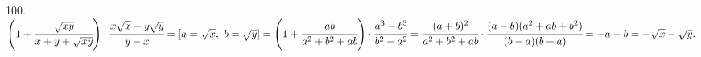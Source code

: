 100. $\left(1+\cfrac{\sqrt{xy}}{x+y+\sqrt{xy}}\right)\cdot\cfrac{x\sqrt{x}-y\sqrt{y}}{y-x}=
[a=\sqrt{x},\ b=\sqrt{y}]=\left(1+\cfrac{ab}{a^2+b^2+ab}\right)\cdot \cfrac{a^3-b^3}{b^2-a^2}=
\cfrac{(a+b)^2}{a^2+b^2+ab}\cdot \cfrac{(a-b)(a^2+ab+b^2)}{(b-a)(b+a)}=-a-b=-\sqrt{x}-\sqrt{y}.$\\
